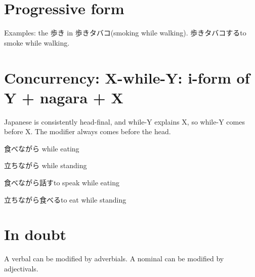 \section{Progressive form}

Examples:
the 歩き in 歩きタバコ(smoking while walking).
歩きタバコするto smoke while walking.

\section{Concurrency: X-while-Y: i-form of Y + nagara + X}

Japanese is consistently head-final,
and while-Y explains X,
so while-Y comes before X.
The modifier always comes before the head.

食べながら while eating

立ちながら while standing

食べながら話すto speak while eating

立ちながら食べるto eat while standing

\section{In doubt}

A verbal can be modified by adverbials.
A nominal can be modified by adjectivals.
